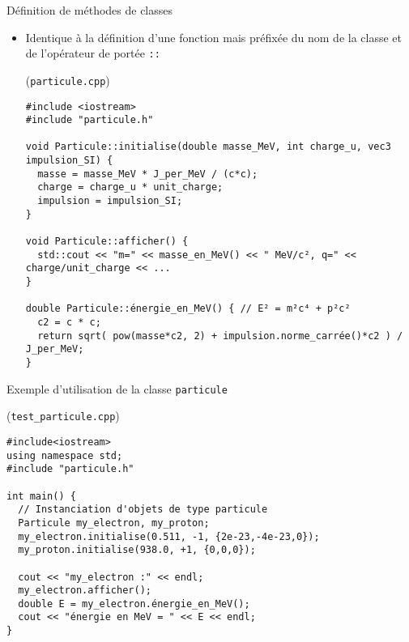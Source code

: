 \documentclass[c]{beamer}
\begin{document}
 
\begin{frame}[fragile]{Définition de méthodes de classes}

\begin{itemize}
\item Identique à la définition d'une fonction mais préfixée du nom de la classe et
de l'opérateur de portée \texttt{::}
\begin{cbox}[][lwuc](\texttt{particule.cpp})
\begin{verbatim}
#include <iostream>
#include "particule.h"

void Particule::initialise(double masse_MeV, int charge_u, vec3 impulsion_SI) {
  masse = masse_MeV * J_per_MeV / (c*c);
  charge = charge_u * unit_charge;
  impulsion = impulsion_SI;
}

void Particule::afficher() {
  std::cout << "m=" << masse_en_MeV() << " MeV/c², q=" << charge/unit_charge << ...
}

double Particule::énergie_en_MeV() { // E² = m²c⁴ + p²c²
  c2 = c * c;
  return sqrt( pow(masse*c2, 2) + impulsion.norme_carrée()*c2 ) / J_per_MeV;
}
\end{verbatim}
\end{cbox}
\end{itemize}

\end{frame}


\begin{frame}[fragile]{Exemple d'utilisation de la classe \texttt{particule}}

\begin{cbox}[][lwuc](\texttt{test\_particule.cpp})
\begin{verbatim}
#include<iostream>
using namespace std;
#include "particule.h"

int main() {
  // Instanciation d'objets de type particule
  Particule my_electron, my_proton;
  my_electron.initialise(0.511, -1, {2e-23,-4e-23,0});
  my_proton.initialise(938.0, +1, {0,0,0});

  cout << "my_electron :" << endl;
  my_electron.afficher();
  double E = my_electron.énergie_en_MeV();
  cout << "énergie en MeV = " << E << endl;
}
\end{verbatim}
\end{cbox}

\end{frame}
\end{document}
